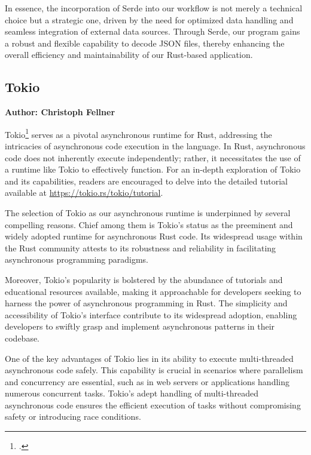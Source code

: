 In essence, the incorporation of Serde into our workflow is not merely a technical choice but a strategic one, driven by the need for optimized data handling 
and seamless integration of external data sources. Through Serde, our program gains a robust and flexible capability to decode JSON files, thereby enhancing the
overall efficiency and maintainability of our Rust-based application.

\subsection{Tokio}
\textbf{Author: Christoph Fellner}

Tokio\footcite{tokio} serves as a pivotal asynchronous runtime for Rust, addressing the intricacies of asynchronous code execution in the language. In Rust, 
asynchronous code does not inherently execute independently; rather, it necessitates the use of a runtime like Tokio to effectively function. For an in-depth 
exploration of Tokio and its capabilities, readers are encouraged to delve into the detailed tutorial available at 
\href{https://tokio.rs/tokio/tutorial}{https://tokio.rs/tokio/tutorial}.\newline

The selection of Tokio as our asynchronous runtime is underpinned by several compelling reasons. Chief among them is Tokio's status as the preeminent and widely
adopted runtime for asynchronous Rust code. Its widespread usage within the Rust community attests to its robustness and reliability in facilitating asynchronous
programming paradigms.\newline

Moreover, Tokio's popularity is bolstered by the abundance of tutorials and educational resources available, making it approachable for developers seeking to 
harness the power of asynchronous programming in Rust. The simplicity and accessibility of Tokio's interface contribute to its widespread adoption, enabling 
developers to swiftly grasp and implement asynchronous patterns in their codebase.\newline

One of the key advantages of Tokio lies in its ability to execute multi-threaded asynchronous code safely. This capability is crucial in scenarios where 
parallelism and concurrency are essential, such as in web servers or applications handling numerous concurrent tasks. Tokio's adept handling of multi-threaded 
asynchronous code ensures the efficient execution of tasks without compromising safety or introducing race conditions.\newline



